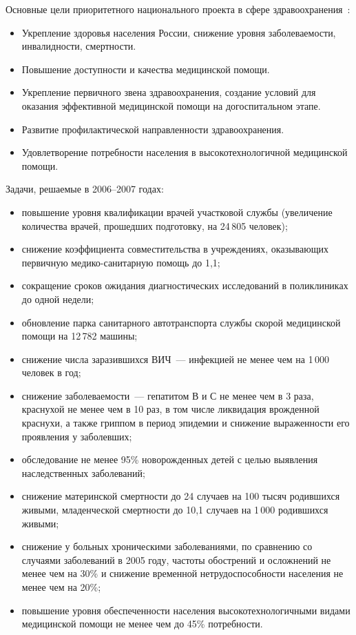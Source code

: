 \documentclass[article, 12pt, russian, oneside]{ncc}
\begin{document}
Основные цели приоритетного национального проекта в сфере
здравоохранения~\cite{Health_Goals}:

\begin{itemize}
\item Укрепление здоровья населения России, снижение уровня
  заболеваемости, инвалидности, смертности.
\item Повышение доступности и качества медицинской помощи.
\item Укрепление первичного звена здравоохранения, создание условий
  для оказания эффективной медицинской помощи на догоспитальном этапе.
\item Развитие профилактической направленности здравоохранения.
\item Удовлетворение потребности населения в высокотехнологичной
  медицинской помощи.
\end{itemize}

Задачи, решаемые в 2006--2007 годах:

\begin{itemize}
\item повышение уровня квалификации врачей участковой службы
  (увеличение количества врачей, прошедших подготовку, на 24\,805
  человек);
\item снижение коэффициента совместительства в учреждениях,
  оказывающих первичную медико-санитарную помощь до 1,1;
\item сокращение сроков ожидания диагностических исследований в
  поликлиниках до одной недели;
\item обновление парка санитарного автотранспорта службы скорой
  медицинской помощи на 12\,782 машины;
\item снижение числа заразившихся ВИЧ~--- инфекцией не менее чем на
  1\,000 человек в год;
\item снижение заболеваемости~--- гепатитом В и С не менее чем в 3
  раза, краснухой не менее чем в 10 раз, в том числе ликвидация
  врожденной краснухи, а также гриппом в период эпидемии и снижение
  выраженности его проявления у заболевших;
\item обследование не менее 95\% новорожденных детей с целью выявления
  наследственных заболеваний;
\item снижение материнской смертности до 24 случаев на 100 тысяч
  родившихся живыми, младенческой смертности до 10,1 случаев на 1\,000
  родившихся живыми;
\item снижение у больных хроническими заболеваниями, по сравнению со
  случаями заболеваний в 2005 году, частоты обострений и осложнений не
  менее чем на 30\% и снижение временной нетрудоспособности населения
  не менее чем на 20\%;
\item повышение уровня обеспеченности населения высокотехнологичными
  видами медицинской помощи не менее чем до 45\% потребности.
\end{itemize}
\end{document}
